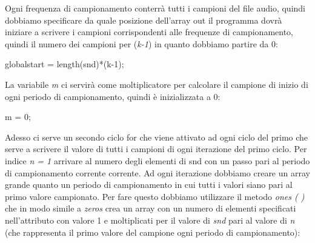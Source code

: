 \documentclass[11pt]{article}
\begin{document}
\begin{multicols*}{2}
\noindent Ogni frequenza di campionamento conterrà tutti i campioni del file audio, quindi dobbiamo specificare da quale posizione dell’array out il programma dovrà iniziare a scrivere i campioni corrispondenti alle frequenze di campionamento, quindi il numero dei campioni per (\textit {k-1}) in quanto dobbiamo partire da 0:

\vspace{0.3cm}

\begin{center}
\begin{minipage}[c]{6cm}
\begin{sffamily}

globalstart = length(snd)*(k-1);\\

\end{sffamily}
\end{minipage}
\end{center}

\noindent La variabile \textit m ci servirà come moltiplicatore per calcolare il campione di inizio di ogni periodo di campionamento, quindi è inizializzata a 0:

\vspace{0.3cm}

\begin{center}
\begin{minipage}[c]{2cm}
\begin{sffamily}

m = 0;\\

\end{sffamily}
\end{minipage}
\end{center}

\noindent Adesso ci serve un secondo ciclo for che viene attivato ad ogni ciclo del primo che serve a scrivere il valore di tutti i campioni di ogni iterazione del primo ciclo. Per indice \textit {n = 1} arrivare al numero degli elementi di snd con un passo pari al periodo di campionamento corrente corrente. Ad ogni iterazione dobbiamo creare un array grande quanto un periodo di campionamento in cui tutti i valori siano pari al primo valore campionato. Per fare questo dobbiamo utilizzare il metodo \textit {ones (  )} che in modo simile a \textit {zeros} crea un array con un numero di elementi specificati nell’attributo con valore 1 e moltiplicati per il valore di \textit {snd} pari al valore di \textit n (che rappresenta il primo valore del campione ogni periodo di campionamento):


\end{multicols*}
\end{document}
